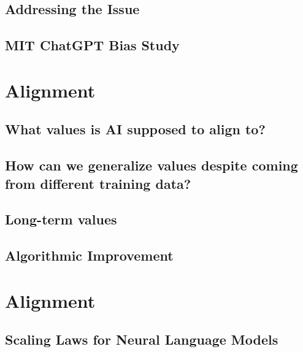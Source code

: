 \documentclass[
]{book}
\begin{document}
\hypertarget{addressing-the-issue}{%
\section{Addressing the Issue}\label{addressing-the-issue}}

\hypertarget{mit-chatgpt-bias-study}{%
\section{MIT ChatGPT Bias Study}\label{mit-chatgpt-bias-study}}

\hypertarget{alignment}{%
\chapter{Alignment}\label{alignment}}

\hypertarget{what-values-is-ai-supposed-to-align-to}{%
\section{What values is AI supposed to align to?}\label{what-values-is-ai-supposed-to-align-to}}

\hypertarget{how-can-we-generalize-values-despite-coming-from-different-training-data}{%
\section{How can we generalize values despite coming from different training data?}\label{how-can-we-generalize-values-despite-coming-from-different-training-data}}

\hypertarget{long-term-values}{%
\section{Long-term values}\label{long-term-values}}

\hypertarget{algorithmic-improvement}{%
\section{Algorithmic Improvement}\label{algorithmic-improvement}}

\hypertarget{alignment-1}{%
\chapter{Alignment}\label{alignment-1}}

\hypertarget{scaling-laws-for-neural-language-models}{%
\section{Scaling Laws for Neural Language Models}\label{scaling-laws-for-neural-language-models}}
\end{document}
